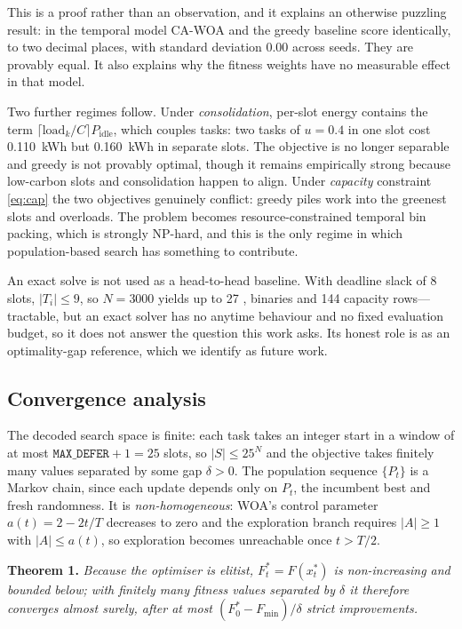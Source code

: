 \documentclass[12pt,a4paper]{article}
\providecommand{\DIFaddtex}[1]{{\protect\color{blue} \sf #1}} %
\providecommand{\DIFadd}[1]{\texorpdfstring{\DIFaddtex{#1}}{#1}} %
\begin{document}
\vspace{2pt}\noindent \DIFadd{This is a proof rather than an observation, and it explains an otherwise puzzling
result: in the temporal model CA-WOA and the greedy baseline score identically, to two decimal places, with
standard deviation 0.00 across seeds. They are provably equal. It also explains why the fitness weights have
no measurable effect in that model.
}

\DIFadd{Two further regimes follow. Under \emph{consolidation}, per-slot energy contains the term
$\lceil \text{load}_k/C\rceil P_{\text{idle}}$, which couples tasks: two tasks of $u=0.4$ in one slot cost
0.110~kWh but 0.160~kWh in separate slots. The objective is no longer separable and greedy is not provably
optimal, though it remains empirically strong because low-carbon slots and consolidation happen to align.
Under \emph{capacity} constraint \eqref{eq:cap} the two objectives genuinely conflict: greedy piles work into
the greenest slots and overloads. The problem becomes resource-constrained temporal bin packing, which is
strongly NP-hard, and this is the only regime in which population-based search has something to contribute.
}

\DIFadd{An exact solve is not used as a head-to-head baseline. With deadline slack of 8 slots, $|T_i|\le 9$, so
$N=3000$ yields up to 27}{\DIFadd{,}}\DIFadd{000 binaries and 144 capacity rows---tractable, but an exact solver has no anytime
behaviour and no fixed evaluation budget, so it does not answer the question this work asks. Its honest role
is as an optimality-gap reference, which we identify as future work.
}

\subsection{\DIFadd{Convergence analysis}}\label{sec:conv}
\DIFadd{The decoded search space is finite: each task takes an integer start in a window of at most
$\texttt{MAX\_DEFER}+1=25$ slots, so $|S|\le 25^{N}$ and the objective takes finitely many values separated by
some gap $\delta>0$. The population sequence $\{P_t\}$ is a Markov chain, since each update depends only on
$P_t$, the incumbent best and fresh randomness. It is \emph{non-homogeneous}: WOA's control parameter
$a(t)=2-2t/T$ decreases to zero and the exploration branch requires $|A|\ge 1$ with $|A|\le a(t)$, so
exploration becomes unreachable once $t>T/2$.
}

\vspace{2pt}\noindent\DIFadd{\textbf{Theorem 1.} \emph{Because the optimiser is elitist, $F^{*}_t=F(x^{*}_t)$ is
non-increasing and bounded below; with finitely many fitness values separated by $\delta$ it therefore
converges almost surely, after at most $(F^{*}_0-F_{\min})/\delta$ strict improvements.}
}
\end{document}
